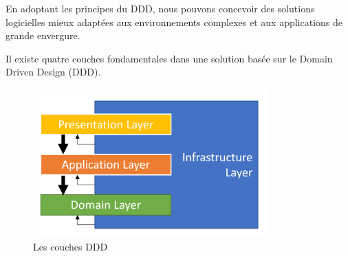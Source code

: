 En adoptant les principes du DDD, nous pouvons concevoir des solutions logicielles mieux adaptées aux environnements complexes et aux applications de grande envergure.

Il existe quatre couches fondamentales dans une solution basée sur le Domain Driven Design (DDD).

\begin{figure}[H]
    \centering
    \includegraphics[width=9cm]{Figures/dddl.png}
    \caption{Les couches DDD}
\end{figure}


